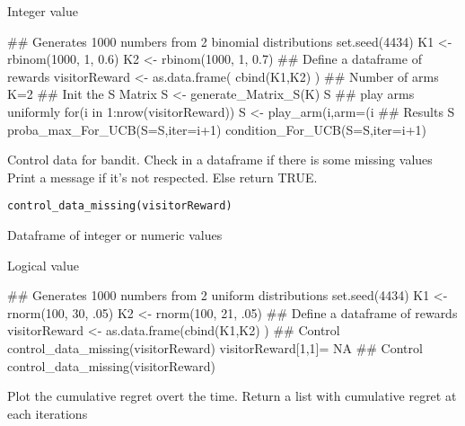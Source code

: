 \documentclass[letterpaper]{book}
\begin{document}
%
\begin{Value}
Integer value
\end{Value}
%
\begin{Examples}
\begin{ExampleCode}
## Generates 1000 numbers from 2 binomial distributions
set.seed(4434)
K1 <- rbinom(1000, 1, 0.6)
K2 <- rbinom(1000, 1, 0.7)
## Define a dataframe of rewards
visitorReward <- as.data.frame( cbind(K1,K2) )
## Number of arms
K=2
## Init the S Matrix
S <- generate_Matrix_S(K)
S
## play arms uniformly
for(i in 1:nrow(visitorReward)){
S <- play_arm(i,arm=(i%
}
## Results
S
proba_max_For_UCB(S=S,iter=i+1)
condition_For_UCB(S=S,iter=i+1)
\end{ExampleCode}
\end{Examples}
%
\begin{Description}\relax
Control data for bandit.
Check in a dataframe if there is some missing values
Print a message if it's not respected.
Else return TRUE.
\end{Description}
%
\begin{Usage}
\begin{verbatim}
control_data_missing(visitorReward)
\end{verbatim}
\end{Usage}
%
\begin{Arguments}
\begin{ldescription}
\item[\code{visitorReward}] Dataframe of integer or numeric values
\end{ldescription}
\end{Arguments}
%
\begin{Value}
Logical value
\end{Value}
%
\begin{Examples}
\begin{ExampleCode}
## Generates 1000 numbers from 2 uniform distributions
set.seed(4434)
K1 <- rnorm(100, 30, .05)
K2 <- rnorm(100, 21, .05)
## Define a dataframe of rewards
visitorReward <- as.data.frame(cbind(K1,K2) )
## Control
control_data_missing(visitorReward)
visitorReward[1,1]= NA
## Control
control_data_missing(visitorReward)

\end{ExampleCode}
\end{Examples}
%
\begin{Description}\relax
Plot the cumulative regret overt the time.
Return a list with cumulative regret at each iterations
\end{Description}
\end{document}
